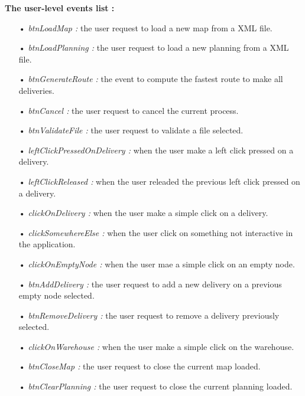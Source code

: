 \documentclass[paper=a4,fontsize=11pt]{report}
\numberwithin{equation}{section}		%
\numberwithin{figure}{section}		%
\numberwithin{table}{section}		%
\renewcommand{\bf}[1]{\textbf{#1}}
\renewcommand{\it}[1]{\textit{#1}}
\begin{document}
\bf{The user-level events list :}
\begin{itemize}
  \item[•] \it{btnLoadMap :} the user request to load a new map from a XML file.
  \item[•] \it{btnLoadPlanning :} the user request to load a new planning from a XML file.
  \item[•] \it{btnGenerateRoute :} the event to compute the fastest route to make all deliveries.
  \item[•] \it{btnCancel :} the user request to cancel the current process.
  \item[•] \it{btnValidateFile :} the user request to validate a file selected.
  \item[•] \it{leftClickPressedOnDelivery :} when the user make a left click pressed on a delivery.
  \item[•] \it{leftClickReleased :} when the user releaded the previous left click pressed on a delivery.
  \item[•] \it{clickOnDelivery :} when the user make a simple click on a delivery.
  \item[•] \it{clickSomewhereElse :} when the user click on something not interactive in the application.
  \item[•] \it{clickOnEmptyNode :} when the user mae a simple click on an empty node.
  \item[•] \it{btnAddDelivery :} the user request to add a new delivery on a previous empty node selected.
  \item[•] \it{btnRemoveDelivery :} the user request to remove a delivery previously selected.
  \item[•] \it{clickOnWarehouse :} when the user make a simple click on the warehouse.
  \item[•] \it{btnCloseMap :} the user request to close the current map loaded.
  \item[•] \it{btnClearPlanning :} the user request to close the current planning loaded.
\end{itemize}
\end{document}
